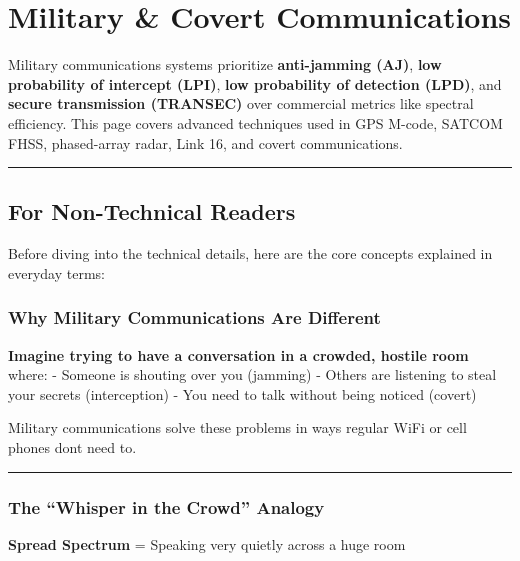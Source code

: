 \section{Military \& Covert
Communications}\label{military-covert-communications}

Military communications systems prioritize \textbf{anti-jamming (AJ)},
\textbf{low probability of intercept (LPI)}, \textbf{low probability of
detection (LPD)}, and \textbf{secure transmission (TRANSEC)} over
commercial metrics like spectral efficiency. This page covers advanced
techniques used in GPS M-code, SATCOM FHSS, phased-array radar, Link 16,
and covert communications.

\begin{center}\rule{0.5\linewidth}{0.5pt}\end{center}

\subsection{\texorpdfstring{ For Non-Technical
Readers}{ For Non-Technical Readers}}\label{for-non-technical-readers}

Before diving into the technical details, here are the core concepts
explained in everyday terms:

\subsubsection{Why Military Communications Are
Different}\label{why-military-communications-are-different}

\textbf{Imagine trying to have a conversation in a crowded, hostile
room} where: - Someone is shouting over you (jamming) - Others are
listening to steal your secrets (interception) - You need to talk
without being noticed (covert)

Military communications solve these problems in ways regular WiFi or
cell phones don\textquotesingle t need to.

\begin{center}\rule{0.5\linewidth}{0.5pt}\end{center}

\subsubsection{The ``Whisper in the Crowd''
Analogy}\label{the-whisper-in-the-crowd-analogy}

\textbf{Spread Spectrum} = Speaking very quietly across a huge room

